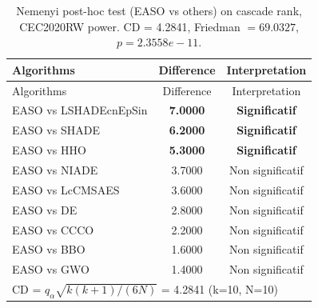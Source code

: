 \begin{center}
\small
\renewcommand{\arraystretch}{1.25}
\begin{longtable}{lcc}
\caption{Nemenyi post-hoc test (EASO vs others) on cascade rank, CEC2020RW  power. CD = 4.2841, Friedman $=69.0327$, $p=2.3558e-11$.}
\label{tab:nemenyi_cascade_CEC2020RW_power} \\
\toprule
Algorithms & Difference & Interpretation \\
\midrule
\endfirsthead
\toprule
Algorithms & Difference & Interpretation \\
\midrule
\endhead
EASO vs LSHADEcnEpSin & \textbf{7.0000} & \textbf{Significatif} \\
EASO vs SHADE & \textbf{6.2000} & \textbf{Significatif} \\
EASO vs HHO & \textbf{5.3000} & \textbf{Significatif} \\
EASO vs NIADE & 3.7000 & Non significatif \\
EASO vs LcCMSAES & 3.6000 & Non significatif \\
EASO vs DE & 2.8000 & Non significatif \\
EASO vs CCCO & 2.2000 & Non significatif \\
EASO vs BBO & 1.6000 & Non significatif \\
EASO vs GWO & 1.4000 & Non significatif \\
\midrule
\multicolumn{3}{l}{CD = $q_\alpha \sqrt{k(k+1)/(6N)}$ = 4.2841 (k=10, N=10)} \\
\bottomrule
\end{longtable}
\end{center}